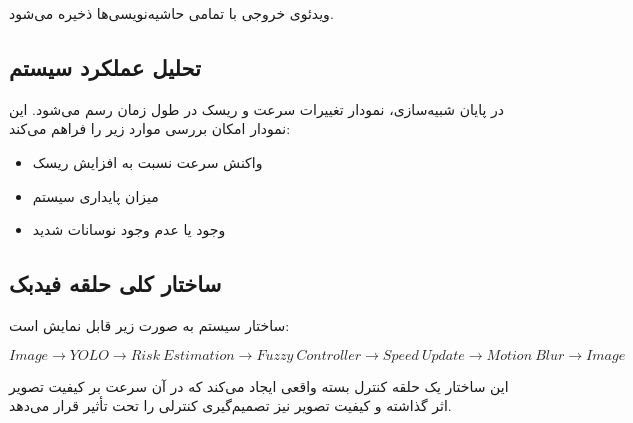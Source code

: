 \documentclass[a4paper, 10pt, twocolumn]{article}
\begin{document}
	ویدئوی خروجی با تمامی حاشیه‌نویسی‌ها ذخیره می‌شود.
	
	
	\subsection{تحلیل عملکرد سیستم}
	
	در پایان شبیه‌سازی، نمودار تغییرات سرعت و ریسک در طول زمان رسم می‌شود. این نمودار امکان بررسی موارد زیر را فراهم می‌کند:
	
	\begin{itemize}
		\item واکنش سرعت نسبت به افزایش ریسک
		\item میزان پایداری سیستم
		\item وجود یا عدم وجود نوسانات شدید
	\end{itemize}
	
	
	\subsection{ساختار کلی حلقه فیدبک}
	
	ساختار سیستم به صورت زیر قابل نمایش است:
	
	\[
	Image
	\rightarrow YOLO
	\rightarrow Risk\ Estimation
	\rightarrow Fuzzy\ Controller
	\rightarrow Speed\ Update
	\rightarrow Motion\ Blur
	\rightarrow Image
	\]
	
	این ساختار یک حلقه کنترل بسته واقعی ایجاد می‌کند که در آن سرعت بر کیفیت تصویر اثر گذاشته و کیفیت تصویر نیز تصمیم‌گیری کنترلی را تحت تأثیر قرار می‌دهد.
	
\end{document}
